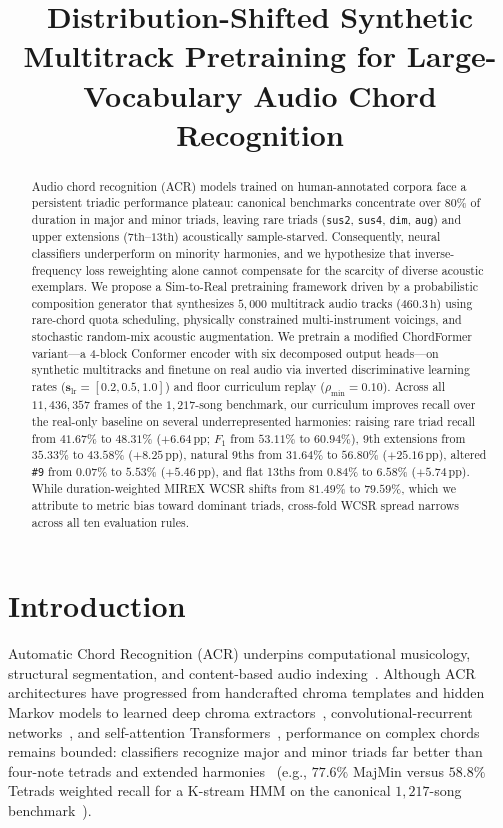 \documentclass{article}
\title{Distribution-Shifted Synthetic Multitrack Pretraining for Large-Vocabulary Audio Chord Recognition}
\begin{document}
\maketitle

\begin{abstract}
Audio chord recognition (ACR) models trained on human-annotated corpora face a persistent triadic performance plateau: canonical benchmarks concentrate over $80\%$ of duration in major and minor triads, leaving rare triads ({\small\texttt{sus2}}, {\small\texttt{sus4}}, {\small\texttt{dim}}, {\small\texttt{aug}}) and upper extensions ($7\text{th}$--$13\text{th}$) acoustically sample-starved. Consequently, neural classifiers underperform on minority harmonies, and we hypothesize that inverse-frequency loss reweighting alone cannot compensate for the scarcity of diverse acoustic exemplars. We propose a Sim-to-Real pretraining framework driven by a probabilistic composition generator that synthesizes $5{,}000$ multitrack audio tracks ($460.3\,\text{h}$) using rare-chord quota scheduling, physically constrained multi-instrument voicings, and stochastic random-mix acoustic augmentation. We pretrain a modified ChordFormer variant---a 4-block Conformer encoder with six decomposed output heads---on synthetic multitracks and finetune on real audio via inverted discriminative learning rates ($\mathbf{s}_{\text{lr}} = [0.2, 0.5, 1.0]$) and floor curriculum replay ($\rho_{\min}=0.10$). Across all $11{,}436{,}357$ frames of the $1{,}217$-song benchmark, our curriculum improves recall over the real-only baseline on several underrepresented harmonies: raising rare triad recall from $41.67\%$ to $48.31\%$ ($+6.64\,\text{pp}$; $F_1$ from $53.11\%$ to $60.94\%$), 9th extensions from $35.33\%$ to $43.58\%$ ($+8.25\,\text{pp}$), natural 9ths from $31.64\%$ to $56.80\%$ ($+25.16\,\text{pp}$), altered {\small\texttt{\#9}} from $0.07\%$ to $5.53\%$ ($+5.46\,\text{pp}$), and flat 13ths from $0.84\%$ to $6.58\%$ ($+5.74\,\text{pp}$). While duration-weighted MIREX WCSR shifts from $81.49\%$ to $79.59\%$, which we attribute to metric bias toward dominant triads, cross-fold WCSR spread narrows across all ten evaluation rules.
\end{abstract}
\section{Introduction}\label{sec:intro}

Automatic Chord Recognition (ACR) underpins computational musicology, structural segmentation, and content-based audio indexing~\cite{pauwels2019twenty}. Although ACR architectures have progressed from handcrafted chroma templates and hidden Markov models to learned deep chroma extractors~\cite{korzeniowski2016feature}, convolutional-recurrent networks~\cite{jiang2019large}, and self-attention Transformers~\cite{park2019btc,gulati2020conformer}, performance on complex chords remains bounded: classifiers recognize major and minor triads far better than four-note tetrads and extended harmonies~\cite{pauwels2019twenty} (e.g., $77.6\%$ MajMin versus $58.8\%$ Tetrads weighted recall for a K-stream HMM on the canonical $1{,}217$-song benchmark~\cite{humphrey2015four}).
\end{document}
